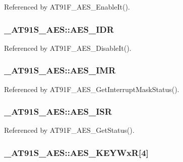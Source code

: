 Referenced by AT91F\_\-AES\_\-EnableIt().\hypertarget{struct__AT91S__AES_90641cdaa7cb555907f56ceaebba1140}{
\subsubsection{ {\bf \_\-AT91S\_\-AES::AES\_\-IDR}}}
\label{struct__AT91S__AES_90641cdaa7cb555907f56ceaebba1140}




Referenced by AT91F\_\-AES\_\-DisableIt().\hypertarget{struct__AT91S__AES_0e6b99ee7321d011bc6f3c7347849270}{
\subsubsection{ {\bf \_\-AT91S\_\-AES::AES\_\-IMR}}}
\label{struct__AT91S__AES_0e6b99ee7321d011bc6f3c7347849270}




Referenced by AT91F\_\-AES\_\-GetInterruptMaskStatus().\hypertarget{struct__AT91S__AES_072ce6f604d1f9d50f3fcaa145ec7d1e}{
\subsubsection{ {\bf \_\-AT91S\_\-AES::AES\_\-ISR}}}
\label{struct__AT91S__AES_072ce6f604d1f9d50f3fcaa145ec7d1e}




Referenced by AT91F\_\-AES\_\-GetStatus().\hypertarget{struct__AT91S__AES_17f870b3397d6bc35dcd325b83d9ff01}{
\subsubsection{ {\bf \_\-AT91S\_\-AES::AES\_\-KEYWxR}\mbox{[}4\mbox{]}}}
\label{struct__AT91S__AES_17f870b3397d6bc35dcd325b83d9ff01}




